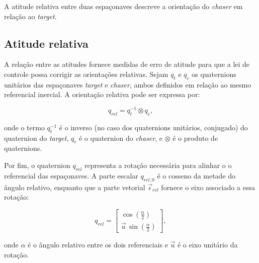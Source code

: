 A atitude relativa entre duas espaçonaves descreve a orientação do \emph{chaser} em relação ao \emph{target}.

\subsection{Atitude relativa}
A relação entre as atitudes fornece medidas de erro de atitude para que a lei de controle possa corrigir as orientações relativas.
Sejam $q_t$ e $q_c$ os quaternions unitários das espaçonaves \emph{target} e \emph{chaser}, ambos definidos em relação ao mesmo referencial inercial. 
A orientação relativa pode ser expressa por:

\begin{equation}
    \label{eq:quat_relativo}
q_{rel}
=
q_t^{-1} \otimes q_c,
\end{equation}

onde o termo $q_t^{-1}$ é o inverso (no caso dos quaternions unitários, conjugado) do quaternion do \emph{target}, $q_c$ é o quaternion do \emph{chaser}, e $\otimes$ é o produto de quaternions.

Por fim, o quaternion $q_{rel}$ representa a rotação necessária para alinhar o o referencial das espaçonaves.
A parte escalar $q_{rel,0}$ é o cosseno da metade do ângulo relativo, enquanto que a parte vetorial $\vec \epsilon_{rel}$ fornece o eixo associado a essa rotação:

\begin{equation}
q_{rel} =
\begin{bmatrix}
\cos\!\left(\tfrac{\alpha}{2}\right) \\[4pt]
\vec{u}\,\sin\!\left(\tfrac{\alpha}{2}\right)
\end{bmatrix},
\end{equation}

onde $\alpha$ é o ângulo relativo entre os dois referenciais e $\vec u$ é o eixo unitário da rotação.

